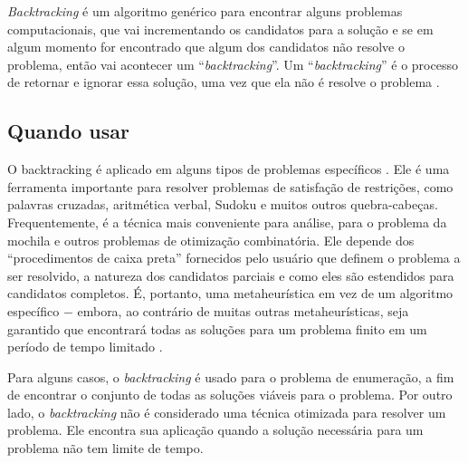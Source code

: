\emph{Backtracking} é um algoritmo genérico para encontrar alguns
problemas computacionais, que vai incrementando os candidatos para a solução
e se em algum momento for encontrado que algum dos candidatos não resolve
o problema, então vai acontecer um ``\emph{backtracking}''. Um ``\emph{backtracking}''
é o processo de retornar e ignorar essa solução, uma vez que ela não é resolve
o problema \cite{BacktrackingAlgorithmsExplained}.

\subsection{Quando usar}

O backtracking é aplicado em alguns tipos de problemas específicos \cite{Backtracking}.
Ele é uma ferramenta importante para resolver problemas de satisfação de restrições, como palavras cruzadas, aritmética verbal, Sudoku e muitos outros quebra-cabeças. 
Frequentemente, é a técnica mais conveniente para análise, para o problema da mochila e outros problemas de otimização combinatória. 
Ele depende dos ``procedimentos de caixa preta'' fornecidos pelo usuário que definem o problema a ser resolvido, a natureza dos candidatos parciais e como eles são estendidos para candidatos completos. 
É, portanto, uma metaheurística em vez de um algoritmo específico $-$ embora, ao contrário de muitas outras metaheurísticas, seja garantido que encontrará todas as soluções para um problema finito em um período de tempo limitado \cite{backtracking-algorithms}. 

Para alguns casos, o \emph{backtracking} é usado para o problema de enumeração, a fim de encontrar o conjunto de todas as soluções viáveis para o problema.
Por outro lado, o \emph{backtracking} não é considerado uma técnica otimizada para resolver um problema. 
Ele encontra sua aplicação quando a solução necessária para um problema não tem limite de tempo.